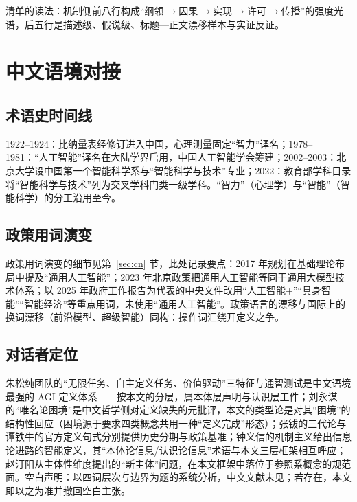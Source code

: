 \documentclass[10pt,fontset=fandol]{ctexart}
\begin{document}
清单的读法：机制侧前八行构成“纲领$\to$因果$\to$实现$\to$许可$\to$传播”的强度光谱，后五行是描述级、假说级、标题—正文漂移样本与实证反证。

\section{中文语境对接}\label{app:cn}

\subsection{术语史时间线}

1922--1924：比纳量表经修订进入中国，心理测量固定“智力”译名；1978--1981：“人工智能”译名在大陆学界启用，中国人工智能学会筹建；2002--2003：北京大学设中国第一个智能科学系与“智能科学与技术”专业；2022：教育部学科目录将“智能科学与技术”列为交叉学科门类一级学科。“智力”（心理学）与“智能”（智能科学）的分工沿用至今。

\subsection{政策用词演变}

政策用词演变的细节见第~\ref{sec:cn} 节，此处记录要点：2017 年规划在基础理论布局中提及“通用人工智能”\cite{state2017plan}；2023 年北京政策把通用人工智能等同于通用大模型技术体系\cite{beijing2023measures}；以 2025 年政府工作报告为代表的中央文件改用“人工智能+”“具身智能”“智能经济”等重点用词，未使用“通用人工智能”\cite{gov2025report}。政策语言的漂移与国际上的换词漂移（前沿模型、超级智能）同构：操作词汇绕开定义之争。

\subsection{对话者定位}

朱松纯团队的“无限任务、自主定义任务、价值驱动”三特征与通智测试\cite{zhu2025tongtest,zhu2023origin,zhu2025moment}是中文语境最强的 AGI 定义体系——按本文的分层，属本体层声明与认识层工件；刘永谋的“唯名论困境”\cite{liu2024complex}是中文哲学侧对定义缺失的元批评，本文的类型论是对其“困境”的结构性回应（困境源于要求四类概念共用一种“定义完成”形态）；张钹的三代论\cite{zhang2020third}与谭铁牛的官方定义句式\cite{tan2024lecture}分别提供历史分期与政策基准；钟义信的机制主义\cite{zhong2018mechanism}给出信息论进路的智能定义，其“本体论信息/认识论信息”术语与本文三层框架相互呼应；赵汀阳\cite{zhao2019selfconscious}从主体性维度提出的“新主体”问题，在本文框架中落位于参照系概念的规范面。空白声明：以四词层次与边界为题的系统分析，中文文献未见；若存在，本文即以之为准并撤回空白主张。
\end{document}
